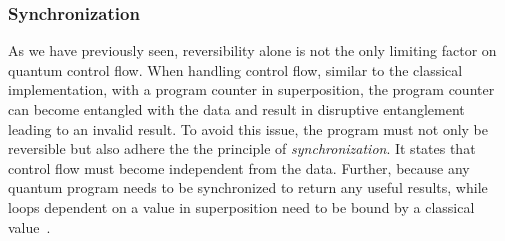 \subsubsection{Synchronization}
\label{sec:background_controlflow_synchronization}
As we have previously seen, reversibility alone is not the only limiting factor on quantum control flow. When handling control flow, similar to the classical implementation, with a program counter in superposition, the program counter can become entangled with the data and result in disruptive entanglement leading to an invalid result. To avoid this issue, the program must not only be reversible but also adhere the the principle of \emph{synchronization}. It states that control flow must become independent from the data. Further, because any quantum program needs to be synchronized to return any useful results, while loops dependent on a value in superposition need to be bound by a classical value~\cite{YVC24}.  